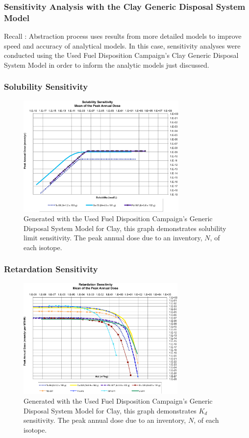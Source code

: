 \begin{frame}[ctb]
\frametitle{Sensitivity Analysis with the Clay Generic Disposal System Model}

Recall : Abstraction process uses results from more detailed models to improve 
speed and accuracy of analytical models. In this case, sensitivity analyses were 
conducted using the Used Fuel Disposition Campaign's Clay Generic Disposal System 
Model \cite{huff_key_2012} in order to inform the analytic models just discussed.



\end{frame}


\begin{frame}[ctb]
\frametitle{Solubility Sensitivity}
\begin{figure}[ht]
  \centering
  \includegraphics[height=60mm]{cyder/images/Solubility_Summary.eps}
  \caption{Generated with the Used Fuel Disposition Campaign's Generic Disposal 
  System Model for Clay, this graph demonstrates solubility limit sensitivity. 
  The peak annual dose due to an inventory, $N$, of each isotope.}
  \label{fig:SolSum}
\end{figure}
\end{frame}

\begin{frame}[ctb]
\frametitle{Retardation Sensitivity}
\begin{figure}[ht]
  \centering
  \includegraphics[height=60mm]{cyder/images/Partitioning_Summary.eps}
  \caption{Generated with the Used Fuel Disposition Campaign's Generic Disposal 
  System Model for Clay, this graph demonstrates $K_d$ sensitivity. 
  The peak annual dose due to an inventory, $N$, of each isotope.}
  \label{fig:KdSum}
\end{figure}
\end{frame}


